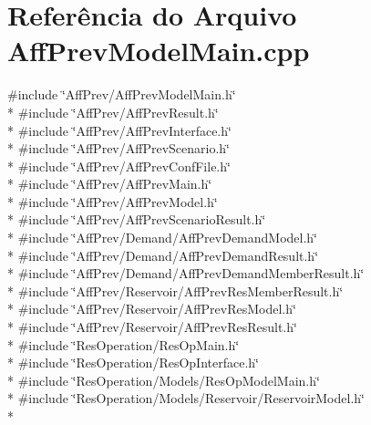 \section{Referência do Arquivo Aff\+Prev\+Model\+Main.\+cpp}
\label{_aff_prev_model_main_8cpp}
{\ttfamily \#include \char`\"{}Aff\+Prev/\+Aff\+Prev\+Model\+Main.\+h\char`\"{}}\\*
{\ttfamily \#include \char`\"{}Aff\+Prev/\+Aff\+Prev\+Result.\+h\char`\"{}}\\*
{\ttfamily \#include \char`\"{}Aff\+Prev/\+Aff\+Prev\+Interface.\+h\char`\"{}}\\*
{\ttfamily \#include \char`\"{}Aff\+Prev/\+Aff\+Prev\+Scenario.\+h\char`\"{}}\\*
{\ttfamily \#include \char`\"{}Aff\+Prev/\+Aff\+Prev\+Conf\+File.\+h\char`\"{}}\\*
{\ttfamily \#include \char`\"{}Aff\+Prev/\+Aff\+Prev\+Main.\+h\char`\"{}}\\*
{\ttfamily \#include \char`\"{}Aff\+Prev/\+Aff\+Prev\+Model.\+h\char`\"{}}\\*
{\ttfamily \#include \char`\"{}Aff\+Prev/\+Aff\+Prev\+Scenario\+Result.\+h\char`\"{}}\\*
{\ttfamily \#include \char`\"{}Aff\+Prev/\+Demand/\+Aff\+Prev\+Demand\+Model.\+h\char`\"{}}\\*
{\ttfamily \#include \char`\"{}Aff\+Prev/\+Demand/\+Aff\+Prev\+Demand\+Result.\+h\char`\"{}}\\*
{\ttfamily \#include \char`\"{}Aff\+Prev/\+Demand/\+Aff\+Prev\+Demand\+Member\+Result.\+h\char`\"{}}\\*
{\ttfamily \#include \char`\"{}Aff\+Prev/\+Reservoir/\+Aff\+Prev\+Res\+Member\+Result.\+h\char`\"{}}\\*
{\ttfamily \#include \char`\"{}Aff\+Prev/\+Reservoir/\+Aff\+Prev\+Res\+Model.\+h\char`\"{}}\\*
{\ttfamily \#include \char`\"{}Aff\+Prev/\+Reservoir/\+Aff\+Prev\+Res\+Result.\+h\char`\"{}}\\*
{\ttfamily \#include \char`\"{}Res\+Operation/\+Res\+Op\+Main.\+h\char`\"{}}\\*
{\ttfamily \#include \char`\"{}Res\+Operation/\+Res\+Op\+Interface.\+h\char`\"{}}\\*
{\ttfamily \#include \char`\"{}Res\+Operation/\+Models/\+Res\+Op\+Model\+Main.\+h\char`\"{}}\\*
{\ttfamily \#include \char`\"{}Res\+Operation/\+Models/\+Reservoir/\+Reservoir\+Model.\+h\char`\"{}}\\*
